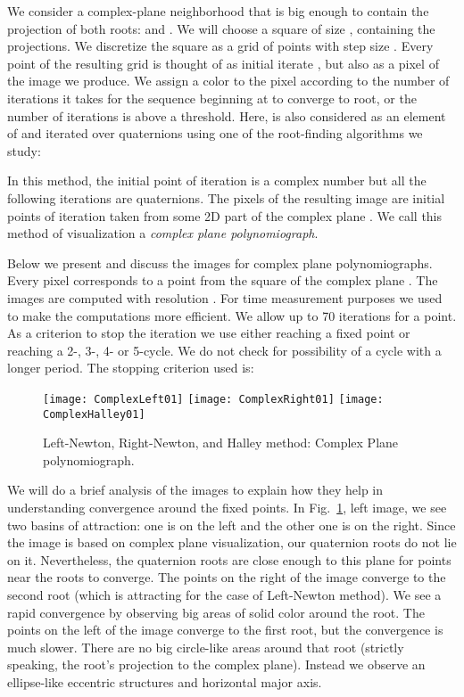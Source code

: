 \documentclass{article}
\theoremstyle{definition}
\begin{document}
We consider a complex-plane neighborhood that is big enough to contain the projection of both roots:  and . We will choose a square of size , containing the projections. We discretize the square as a grid of points with step size . Every point of the resulting grid is thought of as initial iterate , but also as a pixel of the image we produce. We assign a color to the pixel  according to the number of iterations it takes for the sequence beginning at  to converge to root, or the number of iterations is above a threshold. Here,  is also considered as an element of  and iterated over quaternions using one of the root-finding algorithms  we study:

In this method, the initial point of iteration is a complex number but all the following iterations are quaternions. The pixels of the resulting image are initial points of iteration taken from some 2D part of the complex plane . We call this method of visualization a {\it complex plane polynomiograph}.

Below we present and discuss the images for complex plane polynomiographs. Every pixel corresponds to a point from the square of the complex plane .  The images are computed with resolution .   For time measurement purposes we used  to make the computations more efficient.  We allow up to 70 iterations for a point. As a criterion to stop the iteration we use either reaching a fixed point or reaching a 2-, 3-, 4- or 5-cycle. We do not check for possibility of a cycle with a longer period.  The stopping criterion used is:




\begin{figure}
\begin{center}
\texttt{[image: ComplexLeft01]}
\texttt{[image: ComplexRight01]}
\texttt{[image: ComplexHalley01]}
\caption{Left-Newton, Right-Newton, and Halley method: Complex Plane polynomiograph.}
\label{leftComplex}
\end{center}
\end{figure}

We will do a brief analysis of the images to explain how they help in understanding convergence around the fixed points. In  Fig.~\ref{leftComplex}, left image,  we see two basins of attraction: one is on the left and the other one is on the right. Since the image is based on complex plane visualization, our quaternion roots do not lie on it. Nevertheless, the quaternion roots are close enough to this plane for points near the roots to converge. The points on the right of the image converge to the second root (which is attracting for the case of Left-Newton method). We see a rapid convergence by observing big areas of solid color around the root. The points on the left of the image converge to the first root, but the convergence is much slower. There are no big circle-like areas around that root (strictly speaking, the root's projection to the complex plane). Instead we observe an ellipse-like eccentric structures and horizontal major axis.
\end{document}
